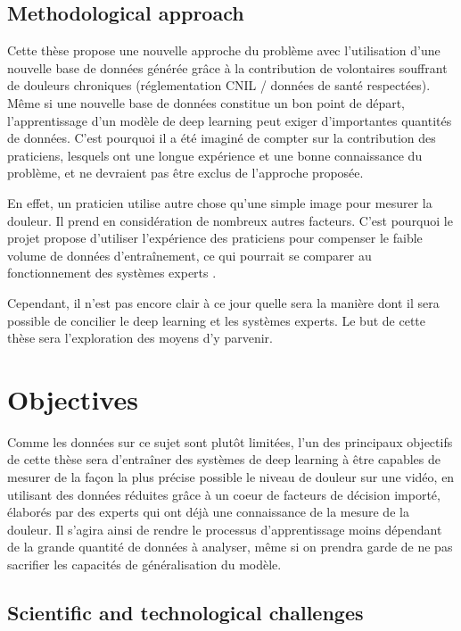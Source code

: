 \documentclass[11pt]{article}
\begin{document}
\subsection{Methodological approach}
\label{sec:org97cce26}

Cette thèse propose une nouvelle approche du problème avec l’utilisation d’une
nouvelle base de données générée grâce à la contribution de volontaires
souffrant de douleurs chroniques (réglementation CNIL / données de santé
respectées). Même si une nouvelle base de données constitue un bon point de
départ, l’apprentissage d’un modèle de deep learning peut exiger d’importantes
quantités de données. C’est pourquoi il a été imaginé de compter sur la
contribution des praticiens, lesquels ont une longue expérience et une bonne
connaissance du problème, et ne devraient pas être exclus de l’approche
proposée. 

En effet, un praticien utilise autre chose qu’une simple image pour mesurer la
douleur. Il prend en considération de nombreux autres facteurs. C’est pourquoi
le projet propose d’utiliser l’expérience des praticiens pour compenser le
faible volume de données d’entraînement, ce qui pourrait se comparer au
fonctionnement des systèmes experts \cite{giarratano1998expert}. 

Cependant, il n’est pas encore clair à ce jour quelle sera la manière dont il
sera possible de concilier le deep learning et les systèmes experts. Le but de
cette thèse sera l’exploration des moyens d’y parvenir. 

\section{Objectives}
\label{sec:orgf1f9281}

Comme les données sur ce sujet sont plutôt limitées, l’un des principaux
objectifs de cette thèse sera d’entraîner des systèmes de deep learning à être
capables de mesurer de la façon la plus précise possible le niveau de douleur
sur une vidéo, en utilisant des données réduites grâce à un coeur de facteurs de
décision importé, élaborés par des experts qui ont déjà une connaissance de la
mesure de la douleur.  
Il s’agira ainsi de rendre le processus d’apprentissage moins dépendant de la
grande quantité de données à analyser, même si on prendra garde de ne pas
sacrifier les capacités de généralisation du modèle.  


\subsection{Scientific and technological challenges}
\label{sec:org70ad40f}
\end{document}
